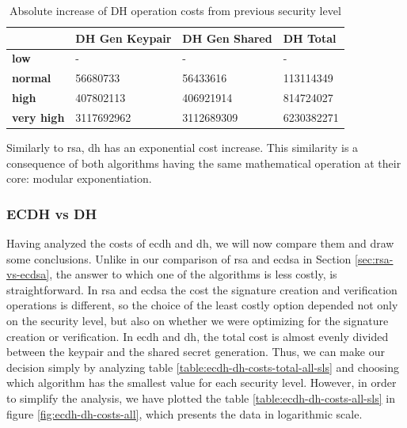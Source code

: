 \documentclass{llncs}
\begin{document}
  \begin{table}[]
    \begin{tabular}{|l|l|l|l|}
    \hline
                       & \textbf{DH Gen Keypair} & \textbf{DH Gen Shared} & \textbf{DH Total} \\ \hline
    \textbf{low}       & -                       & -                      & -                 \\ \hline
    \textbf{normal}    & 56680733                & 56433616               & 113114349         \\ \hline
    \textbf{high}      & 407802113               & 406921914              & 814724027         \\ \hline
    \textbf{very high} & 3117692962              & 3112689309             & 6230382271        \\ \hline
    \end{tabular}
    \centering \caption{\label{table:dh-absolute-cost-increase} Absolute increase of DH operation costs from previous security level}
    \end{table}

Similarly to \gls{rsa}, \gls{dh} has an exponential cost increase. This similarity is a consequence of both algorithms having the same mathematical
operation at their core: modular exponentiation.

\subsubsection{ECDH vs DH}

Having analyzed the costs of \gls{ecdh} and \gls{dh}, we will now compare them and draw some conclusions. Unlike in our comparison of
\gls{rsa} and \gls{ecdsa} in Section \ref{sec:rsa-vs-ecdsa}, the answer to which one of the algorithms is less costly, is straightforward.
In \gls{rsa} and \gls{ecdsa} the cost the signature creation and verification operations is different, so the choice of the least costly
option depended not only on the security level, but also on whether we were optimizing for the signature creation or verification. In \gls{ecdh} and \gls{dh},
the total cost is almost evenly divided between the keypair and the shared secret generation. Thus, we can make our decision simply
by analyzing table \ref{table:ecdh-dh-costs-total-all-sls} and choosing which algorithm has the smallest value for each security level.
However, in order to simplify the analysis, we have plotted the table \ref{table:ecdh-dh-costs-all-sls} in figure \ref{fig:ecdh-dh-costs-all}, which
presents the data in logarithmic scale.
\end{document}
